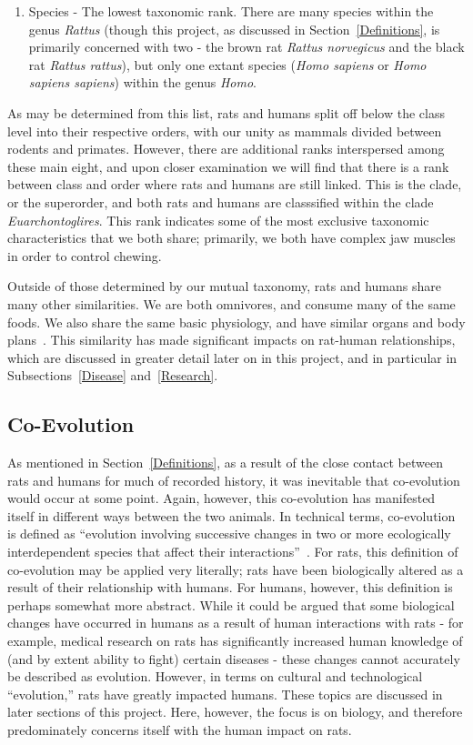 \documentclass[12pt]{article}
\begin{document}
\begin{enumerate}
\item Species - The lowest taxonomic rank. There are many species within the genus \textit{Rattus} (though this project, as discussed in Section~\ref{Definitions}, is primarily concerned with two - the brown rat \textit{Rattus norvegicus} and the black rat \textit{Rattus rattus}), but only one extant species (\textit{Homo sapiens} or \textit{Homo sapiens sapiens}) within the genus \textit{Homo}.
\end{enumerate}
As may be determined from this list, rats and humans split off below the class level into their respective orders, with our unity as mammals divided between rodents and primates. However, there are additional ranks interspersed among these main eight, and upon closer examination we will find that there is a rank between class and order where rats and humans are still linked. This is the clade, or the superorder, and both rats and humans are classsified within the clade \textit{Euarchontoglires}. This rank indicates some of the most exclusive taxonomic characteristics that we both share; primarily, we both have complex jaw muscles in order to control chewing.

Outside of those determined by our mutual taxonomy, rats and humans share many other similarities. We are both omnivores, and consume many of the same foods. We also share the same basic physiology, and have similar organs and body plans~\cite{RatGenomeDatabase, Ensembl2014, Spencer2012}. This similarity has made significant impacts on rat-human relationships, which are discussed in greater detail later on in this project, and in particular in Subsections~\ref{Disease} and~\ref{Research}.

\subsection{Co-Evolution} \label{Co-Evolution}

As mentioned in Section~\ref{Definitions}, as a result of the close contact between rats and humans for much of recorded history, it was inevitable that co-evolution would occur at some point. Again, however, this co-evolution has manifested itself in different ways between the two animals. In technical terms, co-evolution is defined as ``evolution involving successive changes in two or more ecologically interdependent species that affect their interactions''~\cite{CoevolutionDefinition2014}. For rats, this definition of co-evolution may be applied very literally; rats have been biologically altered as a result of their relationship with humans. For humans, however, this definition is perhaps somewhat more abstract. While it could be argued that some biological changes have occurred in humans as a result of human interactions with rats - for example, medical research on rats has significantly increased human knowledge of (and by extent ability to fight) certain diseases - these changes cannot accurately be described as evolution. However, in terms on cultural and technological ``evolution,'' rats have greatly impacted humans. These topics are discussed in later sections of this project. Here, however, the focus is on biology, and therefore predominately concerns itself with the human impact on rats.
\end{document}

